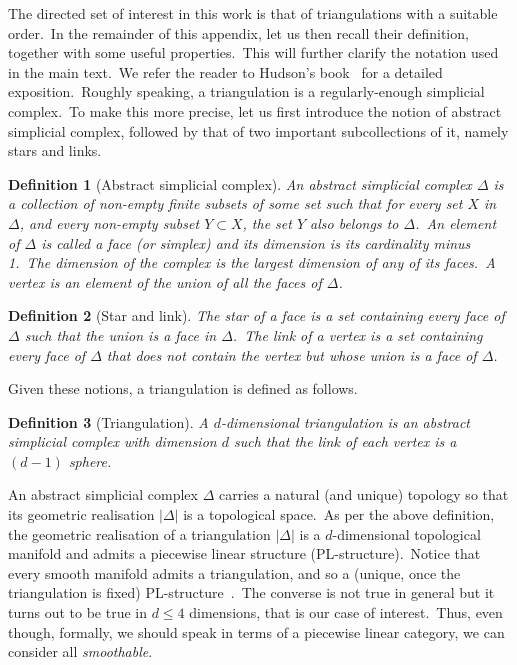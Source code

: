 \documentclass[11pt]{article}
\newtheorem{definition}{Definition}[section]
\theoremstyle{definition}
\numberwithin{equation}{section}
\begin{document}
The directed set of interest in this work is that of triangulations with a suitable order.~In the remainder of this appendix, let us then recall their definition, together with some useful properties.~This will further clarify the notation used in the main text.~We refer the reader to Hudson's book~\cite{Hudson_1969} for a detailed exposition.~Roughly speaking, a  triangulation is a regularly-enough simplicial complex.~To make this more precise, let us first introduce the notion of abstract simplicial complex, followed by that of two important subcollections of it, namely stars and links.
\begin{definition}[Abstract simplicial complex]
An abstract simplicial complex $\Delta$ is a collection of non-empty finite subsets of some set such that for every set $X$ in $\Delta$, and every non-empty subset $Y\subset X$, the set $Y$ also belongs to $\Delta$.~An element of $\Delta$ is called a face (or simplex) and its dimension is its cardinality minus 1.~The dimension of the complex is the largest dimension of any of its faces.~A vertex is an element of the union of all the faces of $\Delta$.
\end{definition}
\begin{definition}[Star and link]
The star of a face is a set containing every face of $\Delta$ such that the union is a face in $\Delta$.~The link of a vertex is a set containing every face of $\Delta$ that does not contain the vertex but whose union is a face of $\Delta$.    
\end{definition}
\noindent
Given these notions, a triangulation is defined as follows.
\begin{definition}[Triangulation]
    A $d$-dimensional triangulation is an abstract simplicial complex with dimension $d$ such that the link of each vertex is a $(d-1)$ sphere.
\end{definition}
An abstract simplicial complex $\Delta$ carries a natural (and unique) topology so that its geometric realisation $|\Delta|$ is a topological space.~As per the above definition, the geometric realisation of a triangulation $|\Delta|$ is a $d$-dimensional topological manifold and admits a piecewise linear structure (PL-structure).~Notice that every smooth manifold admits a triangulation, and so a (unique, once the triangulation is fixed) PL-structure~\cite{Whitehead_1940}.~The converse is not true in general but it turns out to be true in $d\leq 4$ dimensions, that is our case of interest.~Thus, even though, formally, we should speak in terms of a piecewise linear category, we can consider all \textit{smoothable}.
\end{document}
